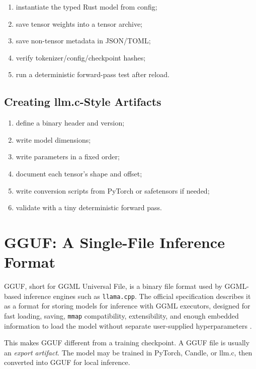 \begin{enumerate}
  \item instantiate the typed Rust model from config;
  \item save tensor weights into a tensor archive;
  \item save non-tensor metadata in JSON/TOML;
  \item verify tokenizer/config/checkpoint hashes;
  \item run a deterministic forward-pass test after reload.
\end{enumerate}

\subsection{Creating llm.c-Style Artifacts}

\begin{enumerate}
  \item define a binary header and version;
  \item write model dimensions;
  \item write parameters in a fixed order;
  \item document each tensor's shape and offset;
  \item write conversion scripts from PyTorch or safetensors if needed;
  \item validate with a tiny deterministic forward pass.
\end{enumerate}

\section{GGUF: A Single-File Inference Format}

GGUF, short for GGML Universal File, is a binary file format used by GGML-based inference
engines such as \texttt{llama.cpp}. The official specification describes it as a format
for storing models for inference with GGML executors, designed for fast loading, saving,
\texttt{mmap} compatibility, extensibility, and enough embedded information to load the
model without separate user-supplied hyperparameters \cite{ggufspec}.

This makes GGUF different from a training checkpoint. A GGUF file is usually an
\emph{export artifact}. The model may be trained in PyTorch, Candle, or llm.c, then
converted into GGUF for local inference.

